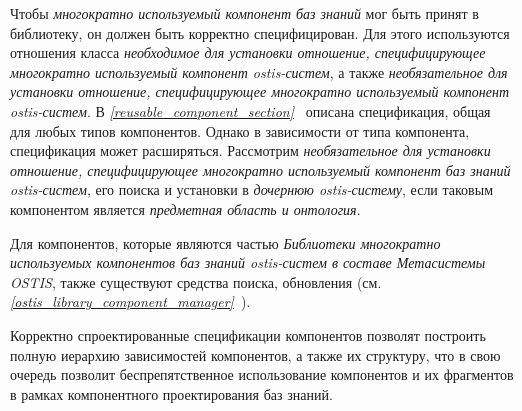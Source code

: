 Чтобы \textit{многократно используемый компонент баз знаний} мог быть принят в библиотеку, он должен быть корректно специфицирован. Для этого используются отношения класса \textit{необходимое для установки отношение, специфицирующее многократно используемый компонент ostis-систем}, а также \textit{необязательное для установки отношение, специфицирующее многократно используемый компонент ostis-систем}. В \textit{\ref{reusable_component_section}~} описана спецификация, общая для любых типов компонентов. Однако в зависимости от типа компонента, спецификация может расширяться. Рассмотрим \textit{необязательное для установки отношение, специфицирующее многократно используемый компонент баз знаний ostis-систем}, его поиска и установки в \textit{дочернюю ostis-систему}, если таковым компонентом является \textit{предметная область и онтология}.

\begin{SCn}
\begin{scnindent}
\end{scnindent}
\begin{scnindent}
\end{scnindent}
\begin{scnindent}
\end{scnindent}
\end{SCn}

Для компонентов, которые являются частью \textit{Библиотеки многократно используемых компонентов баз знаний ostis-систем в составе Метасистемы OSTIS}, также существуют средства поиска, обновления (см. \textit{\ref{ostis_library_component_manager}~}). 

Корректно спроектированные спецификации компонентов позволят построить полную иерархию зависимостей компонентов, а также их структуру, что в свою очередь позволит беспрепятственное использование компонентов и их фрагментов в рамках компонентного проектирования баз знаний.

